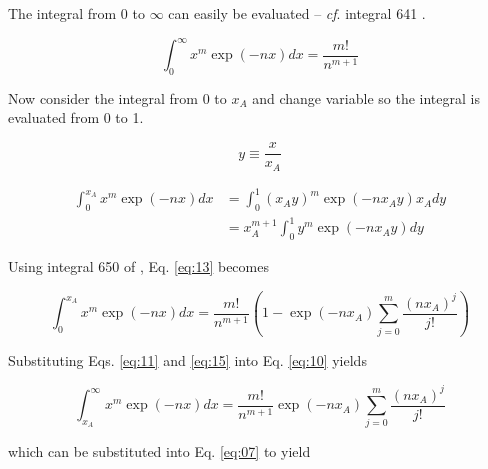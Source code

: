 \documentclass[letterpaper,12pt]{article}
\begin{document}
\noindent The integral from 0 to $\infty$ can easily be evaluated -- \emph{cf}. integral 641 \cite{9780849324796}.

\begin{equation} \label{eq:11}
\int_{0}^{\infty} x^{m} \exp(-nx) dx = \frac{m!}{n^{m+1}}
\end{equation}

Now consider the integral from 0 to $x_{A}$ and change variable so the integral is evaluated from 0 to 1.

\begin{equation} \label{eq:12}
y \equiv \frac{x}{x_{A}}
\end{equation}

\begin{align} \label{eq:13}
\int_{0}^{x_{A}} x^{m} \exp(-nx) dx &= \int_{0}^{1} (x_{A}y)^{m} \exp(-nx_{A}y) x_{A} dy \nonumber \\
 &= x_{A}^{m+1} \int_{0}^{1} y^{m} \exp(-nx_{A}y) dy
\end{align}

\noindent Using integral 650 of \cite{9780849324796}, Eq. \ref{eq:13} becomes

\begin{equation} \label{eq:15}
\int_{0}^{x_{A}} x^{m} \exp(-nx) dx = \frac{m!}{n^{m+1}} \left(1 - \exp(-n x_{A}) \sum_{j = 0}^{m} \frac{(n x_{A})^{j}}{j!} \right) 
\end{equation}

Substituting Eqs. \ref{eq:11} and \ref{eq:15} into Eq. \ref{eq:10} yields

\begin{equation} \label{eq:31}
\int_{x_{A}}^{\infty} x^{m} \exp(-nx) dx = \frac{m!}{n^{m+1}} \exp(-n x_{A}) \sum_{j = 0}^{m} \frac{(n x_{A})^{j}}{j!}
\end{equation}

which can be substituted into Eq. \ref{eq:07} to yield
\end{document}

